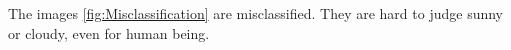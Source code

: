 The images \ref{fig:Misclassification} are misclassified. They are hard to judge sunny or cloudy, even for human being.
\graphicspath{ {./Figures/} }
\begin{figure}[htb]
    \centering
\end{figure}
